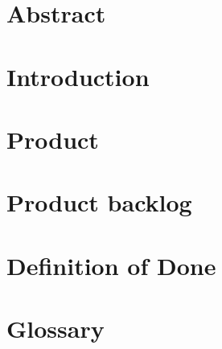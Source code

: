 \documentclass[a4paper]{article}
\begin{document}
	
	
	\section*{Abstract}
	
	\newpage
	
	\tableofcontents
	\newpage
	
	\section{Introduction}
	
	
	\section{Product}
	
	
	\section{Product backlog}
	
	
	\section{Definition of Done}
	
		
	\section{Glossary}
	
	
	{}
	
\end{document}

